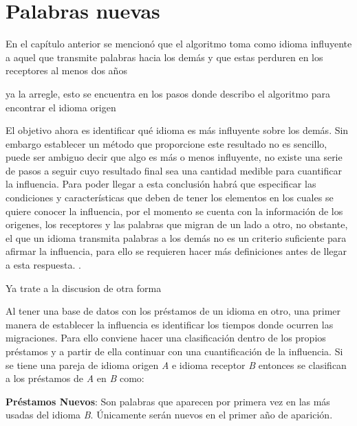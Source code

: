 \chapter{Palabras nuevas}
En el capítulo anterior se mencionó que el algoritmo toma como  idioma
influyente a aquel que transmite palabras hacia los demás y que estas perduren
en los receptores al menos dos años 


\begin{tcolorbox}
	[colback=red!5!white,colframe=red!75!black]
	ya la arregle, esto se encuentra en los pasos donde describo el algoritmo para encontrar el idioma origen
\end{tcolorbox}

El objetivo ahora es identificar qué idioma es más influyente sobre los demás. Sin embargo establecer un método que
proporcione este resultado no es sencillo, puede ser ambiguo decir que algo es más o menos influyente, no existe una serie de pasos a seguir cuyo resultado final sea una cantidad medible para cuantificar la influencia. Para poder llegar a esta conclusión habrá que especificar las condiciones y características que deben de tener los elementos en los cuales se quiere conocer la influencia,  por el momento se cuenta con la información de los origenes, los receptores y las palabras que migran de un lado a otro, no obstante, el que un idioma transmita palabras a los demás no es un criterio suficiente para afirmar la influencia, para ello se requieren hacer más definiciones antes de llegar a esta respuesta.  .

\begin{tcolorbox}
	[colback=red!5!white,colframe=red!75!black]
	Ya trate a la discusion de otra forma
\end{tcolorbox}

Al tener una base de datos  con los préstamos de un idioma en otro,  una primer
manera de establecer la influencia es  identificar los tiempos donde ocurren
las migraciones.  Para ello conviene hacer una clasificación dentro de los
propios préstamos y a partir de ella  continuar con una cuantificación de la
influencia.  Si se tiene una pareja de idioma origen \textit{A} e idioma
receptor \textit{B} entonces se clasifican a los préstamos de \textit{A} en
\textit{B} como:

\textbf{Préstamos Nuevos}: Son palabras que aparecen por primera vez en las más
usadas del idioma \textit{B}.  Únicamente serán nuevos en el primer año de
aparición.  

